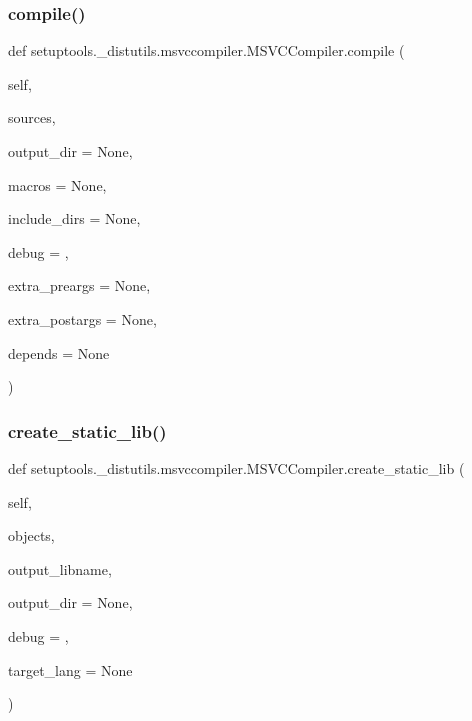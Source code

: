 \subsubsection{\texorpdfstring{compile()}{compile()}}
{\footnotesize\ttfamily def setuptools.\+\_\+distutils.\+msvccompiler.\+M\+S\+V\+C\+Compiler.\+compile (\begin{DoxyParamCaption}\item[{}]{self,  }\item[{}]{sources,  }\item[{}]{output\+\_\+dir = {\ttfamily None},  }\item[{}]{macros = {\ttfamily None},  }\item[{}]{include\+\_\+dirs = {\ttfamily None},  }\item[{}]{debug = {},  }\item[{}]{extra\+\_\+preargs = {\ttfamily None},  }\item[{}]{extra\+\_\+postargs = {\ttfamily None},  }\item[{}]{depends = {\ttfamily None} }\end{DoxyParamCaption})}

\mbox{\label{classsetuptools_1_1__distutils_1_1msvccompiler_1_1MSVCCompiler_a6bd955cc3c7c7ed24be80dc604986f92}} 
\subsubsection{\texorpdfstring{create\+\_\+static\+\_\+lib()}{create\_static\_lib()}}
{\footnotesize\ttfamily def setuptools.\+\_\+distutils.\+msvccompiler.\+M\+S\+V\+C\+Compiler.\+create\+\_\+static\+\_\+lib (\begin{DoxyParamCaption}\item[{}]{self,  }\item[{}]{objects,  }\item[{}]{output\+\_\+libname,  }\item[{}]{output\+\_\+dir = {\ttfamily None},  }\item[{}]{debug = {},  }\item[{}]{target\+\_\+lang = {\ttfamily None} }\end{DoxyParamCaption})}


